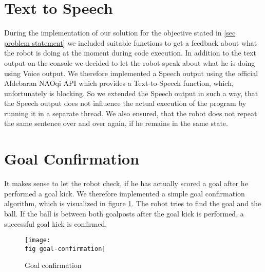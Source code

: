\section{Text to Speech}

During the implementation of our solution for the objective stated in \ref{sec
  problem statement} we included suitable functions to get a feedback about
what the robot is doing at the moment during code execution. In addition to the
text output on the console we decided to let the robot speak about what he is
doing using Voice output. We therefore implemented a Speech output using the
official Aldebaran NAOqi API \cite{naoqi-sdk} which provides a Text-to-Speech
function, which, unfortunately is blocking. So we extended the Speech output in
such a way, that the Speech output does not influence the actual execution of
the program by running it in a separate thread. We also ensured, that the robot
does not repeat the same sentence over and over again, if he remains in the
same state.

\section{Goal Confirmation}

It makes sense to let the robot check, if he has actually scored a goal after
he performed a goal kick. We therefore implemented a simple goal confirmation
algorithm, which is visualized in figure \ref{j figure goal confirmation}. The
robot tries to find the goal and the ball. If the ball is between both
goalposts after the goal kick is performed, a successful goal kick is
confirmed.

\begin{figure}[ht]
  \texttt{[image: \\fig goal-confirmation]}
  \caption{Goal confirmation}
  \label{j figure goal confirmation}
\end{figure}
